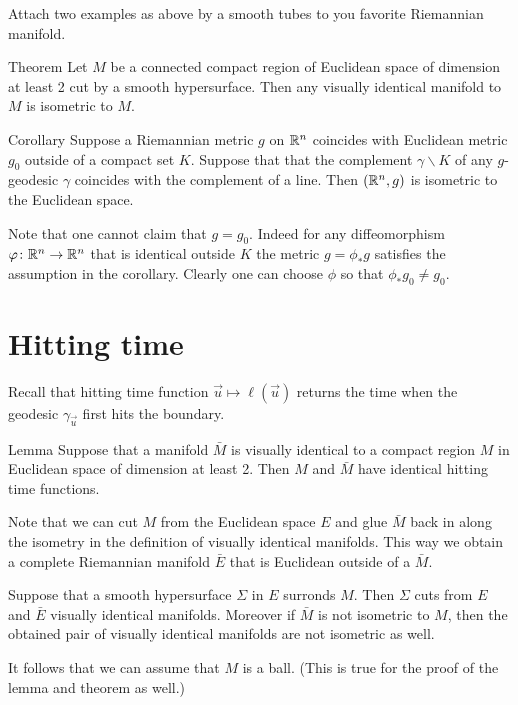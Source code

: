 Attach two examples as above by a smooth tubes to you favorite Riemannian manifold.


\begin{thm}{Theorem}\label{thm:magic-cloak}
Let $M$ be a connected compact region of Euclidean space of dimension at least 2 cut by a smooth hypersurface.
Then any visually identical manifold to $M$ is isometric to $M$.
\end{thm}

\begin{thm}{Corollary}
Suppose a Riemannian metric $g$ on $\mathbb{R}^n$ coincides with Euclidean metric $g_0$ outside of a compact set $K$.
Suppose that that the complement $\gamma\backslash K$ of any $g$-geodesic $\gamma$ coincides with the complement of a line.
Then $(\mathbb{R}^n,g)$ is isometric to the Euclidean space.
\end{thm}

Note that one cannot claim that $g=g_0$.
Indeed for any diffeomorphism $\varphi\colon\mathbb{R}^n\to\mathbb{R}^n$ that is identical outside $K$ the metric $g=\phi_*g$ satisfies the assumption in the corollary.
Clearly one can choose $\phi$ so that $\phi_*g_0\ne g_0$.


\section{Hitting time}

Recall that hitting time function $\vec u\mapsto \ell(\vec u)$ returns the time when the geodesic $\gamma_{\vec u}$ first hits the boundary.

\begin{thm}{Lemma}\label{lem:no-delay}
Suppose that a manifold $\bar M$ is visually identical to a compact region $M$ in Euclidean space of dimension at least 2.
Then $M$ and $\bar M$ have identical hitting time functions. 
\end{thm}

Note that we can cut $M$ from the Euclidean space $E$ and glue $\bar M$ back in along the isometry in the definition of visually identical manifolds.
This way we obtain a complete Riemannian manifold $\bar E$ that is Euclidean outside of a $\bar M$.

Suppose that a smooth hypersurface $\Sigma$ in $E$ surronds $M$.
Then $\Sigma$ cuts from $E$ and $\bar E$ visually identical manifolds.
Moreover if $\bar M$ is not isometric to $M$,
then the obtained pair of visually identical manifolds are not isometric as well.

It follows that we can assume that $M$ is a ball.
(This is true for the proof of the lemma and theorem as well.)

